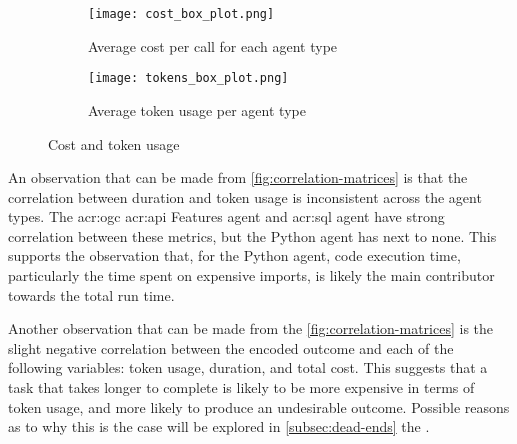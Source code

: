 \begin{figure}[htbp]
    \centering
    \begin{subfigure}[b]{0.48\textwidth}
        \centering
        \texttt{[image: cost\_box\_plot.png]}
        \caption{Average cost per call for each agent type}
        \label{fig:cost-box-plot}
    \end{subfigure}
    \hfill
    \begin{subfigure}[b]{0.48\textwidth}
        \centering
        \texttt{[image: tokens\_box\_plot.png]}
        \caption{Average token usage per agent type}
        \label{fig:tokens-box-plot}
    \end{subfigure}
    \caption{Cost and token usage}
    \label{fig:cost-and-tokens}
\end{figure}

An observation that can be made from \autoref{fig:correlation-matrices} is that the correlation between duration and token usage is inconsistent across the agent types. The \acrshort{acr:ogc} \acrshort{acr:api} Features agent and \acrshort{acr:sql} agent have strong correlation between these metrics, but the Python agent has next to none. This supports the observation that, for the Python agent, code execution time, particularly the time spent on expensive imports, is likely the main contributor towards the total run time.

Another observation that can be made from the \autoref{fig:correlation-matrices} is the slight negative correlation between the encoded outcome and each of the following variables: token usage, duration, and total cost. This suggests that a task that takes longer to complete is likely to be more expensive in terms of token usage, and more likely to produce an undesirable outcome. Possible reasons as to why this is the case will be explored in \autoref{subsec:dead-ends} the .

